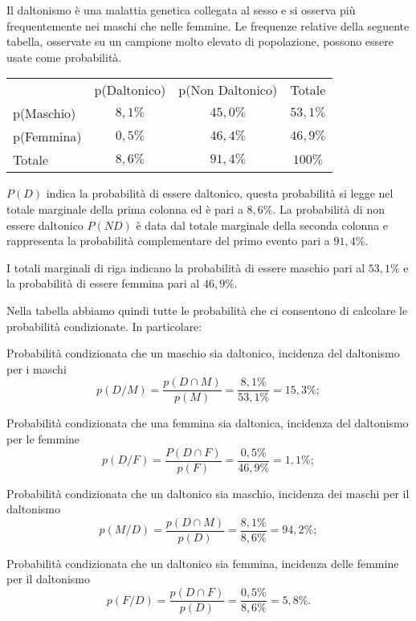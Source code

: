 \begin{exrig}
\begin{esempio}
Il daltonismo è una malattia genetica collegata al sesso e si
osserva più frequentemente nei maschi che nelle femmine. Le frequenze
relative della seguente tabella, osservate su un campione molto elevato
di popolazione, possono essere usate come probabilità.
\begin{center}
\begin{tabular}{lccc}
& p(Daltonico) & p(Non Daltonico) & Totale\\
p(Maschio)& $ 8,1\% $ & $ 45,0\% $ & $ 53,1\% $ \\
p(Femmina)& $ 0,5\% $ & $ 46,4\% $ & $ 46,9\% $ \\
Totale & $ 8,6\% $ & $ 91,4\% $ & $ 100\% $\\
\end{tabular}
\end{center}
$ P(D) $ indica la probabilità di essere daltonico, questa probabilità si
legge nel totale marginale della prima colonna ed è pari a $ 8,6\% $. La
probabilità di non essere daltonico $ P(ND) $ è data dal totale marginale
della seconda colonna e rappresenta la probabilità complementare del
primo evento pari a  $ 91,4\% $.

I totali marginali di riga indicano la probabilità di essere maschio
pari al $ 53,1\% $ e la probabilità di essere femmina pari al $ 46,9\% $.

Nella tabella abbiamo quindi tutte le probabilità che ci consentono di
calcolare le probabilità condizionate. In particolare:
\begin{itemize*}
\item Probabilità condizionata che un maschio sia daltonico, incidenza
del daltonismo per i maschi
\[p(D/M)=\frac{p(D\cap M)}{p(M)}=\frac{8,1\%}{53,1\%}=15,3\%;\]

\item Probabilità condizionata che una femmina sia daltonica, incidenza
del daltonismo per le femmine
\[p(D/F)=\frac{P(D\cap F)}{p(F)}=\frac{0,5\%}{46,9\%}=1,1\%;\] 

\item Probabilità condizionata che un daltonico sia maschio, incidenza
dei maschi per il daltonismo
\[p(M/D)=\frac{p(D\cap M)}{p(D)}=\frac{8,1\%}{8,6\%}=94,2\%;\]

\item Probabilità condizionata che un daltonico sia femmina, incidenza
delle femmine per il daltonismo
\[p(F/D)=\frac{p(D\cap F)}{p(D)}=\frac{0,5\%}{8,6\%}=5,8\%.\]
\end{itemize*}
\end{esempio}


\end{exrig}
